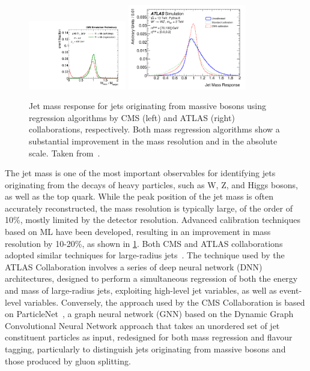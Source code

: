 \documentclass[a4paper,11pt]{article}
\begin{document}
\begin{figure}[t]
\centering
\includegraphics[width=0.38\textwidth]{figure_CMS_MassRegressionPN.pdf}
\includegraphics[width=0.46\textwidth]{figure_ATLAS_mass_reg.pdf}
\caption{Jet mass response for jets originating from massive bosons using regression algorithms by CMS (left) and ATLAS (right) collaborations, respectively.
Both mass regression algorithms show a substantial improvement in the mass resolution and in the absolute scale. Taken from~\cite{CMS-DP-2021-017,atlascollaboration2023simultaneousenergymasscalibration}.
}
\label{fig:MassRegression}
\end{figure}

The jet mass is one of the most important observables for identifying jets originating from the decays of heavy particles, such as W, Z, and Higgs bosons, as well as the top quark.
While the peak position of the jet mass is often accurately reconstructed,
the mass resolution is typically large, of the order of 10\%, mostly limited by the detector resolution.
Advanced calibration techniques based on ML have been developed, resulting in an improvement in mass resolution by 10-20\%,
as shown in \cref{fig:MassRegression}.
Both CMS and ATLAS collaborations adopted similar techniques for large-radius jets~\cite{CMS-DP-2021-017,atlascollaboration2023simultaneousenergymasscalibration}.
The technique used by the ATLAS Collaboration involves a series of deep neural network (DNN) architectures,
designed to perform a simultaneous regression of both the energy and mass of large-radius jets,
exploiting high-level jet variables, as well as event-level variables.
Conversely, the approach used by the CMS Collaboration is based on ParticleNet~\cite{Qu_2020},
a graph neural network (GNN) based on the Dynamic Graph Convolutional Neural Network approach
that takes an unordered set of jet constituent particles as input, redesigned for both mass regression and flavour tagging,
particularly to distinguish jets originating from massive bosons and those produced by gluon splitting.
\end{document}
